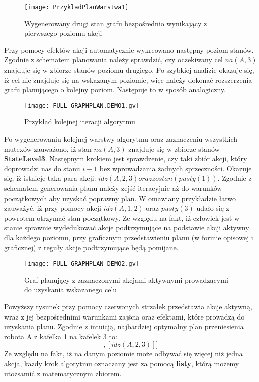     \begin{figure}[H]
        \texttt{[image: PrzykladPlanWarstwa1]}
        \centering
        \caption{Wygenerowany drugi stan grafu bezpośrednio wynikający z pierwszego poziomu akcji}
        \label{PrzykladPlanW1}
    \end{figure}

    Przy pomocy efektów akcji automatycznie wykreowano następny poziom stanów. Zgodnie z schematem planowania należy sprawdzić, czy oczekiwany cel
    $na(A,3)$ znajduje się w zbiorze stanów poziomu drugiego. Po szybkiej analizie okazuje się, iż cel nie znajduje się na wskazanym poziomie, więc
    należy dokonać rozszerzenia grafu planującego o kolejny poziom. Następuje to w sposób analogiczny.

    \begin{figure}[H]
        \texttt{[image: FULL\_GRAPHPLAN.DEMO1.gv]}
        \centering
        \caption{Przykład kolejnej iteracji algorytmu}
        \label{PrzykladPlanW1}
    \end{figure}

    Po wygenerowaniu kolejnej warstwy algorytmu oraz zaznaczeniu wszystkich mutexów zauważono, iż stan $na(A,3)$ znajduje się w zbiorze stanów 
    \textbf{StateLevel3}. Następnym krokiem jest sprawdzenie, czy taki zbiór akcji, który doprowadzi nas do stanu $i-1$ bez wprowadzania żadnych sprzeczności.
    Okazuje się, iż istnieje taka para akcji: $idz(A,2,3) oraz zostan(pusty(1))$. Zgodnie z schematem generowania planu należy zejść iteracyjnie aż do 
    warunków początkowych aby uzyskać poprawny plan. W omawiany przykładzie łatwo zauważyć, iż przy pomocy akcji $idz(A,1,2)$ oraz $pusty(3)$ udało się 
    z powrotem otrzymać stan początkowy. Ze względu na fakt, iż człowiek jest w stanie sprawnie wydedukować akcje podtrzymujące na podstawie 
    akcji aktywny dla każdego poziomu, przy graficznym przedstawieniu planu (w formie opisowej i graficznej) z reguły akcje podtrzymujące będą 
    pomijane.

    \begin{figure}[H]
        \texttt{[image: FULL\_GRAPHPLAN\_DEMO2.gv]}
        \centering
        \caption{Graf planujący z zaznaczonymi akcjami aktywnymi prowadzącymi do uzyskania wskazanego celu}
        \label{PrzykladPlanW1}
    \end{figure}

    Powyższy rysunek przy pomocy czerwonych strzałek przedstawia akcje aktywną, wraz z jej bezpośrednimi warunkami zajścia oraz efektami, które 
    prowadzą do uzyskania planu. Zgodnie z intuicją, najbardziej optymalny plan przeniesienia robota A z kafelka 1 na kafelek 3 to:
    \begin{equation}
        [[idz(A,1,2)],[idz(A,2,3)]]
    \end{equation}
    Ze względu na fakt, iż na danym poziomie może odbywać się więcej niż jedna akcja, każdy krok algorytmu oznaczany jest za pomocą \textbf{listy}, 
    którą możemy utożsamić z matematycznym zbiorem.

